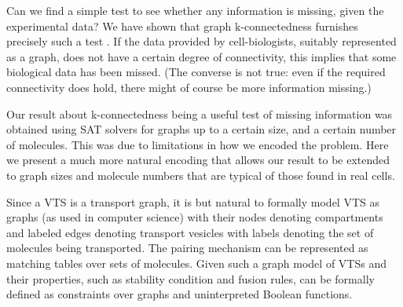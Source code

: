 Can we find a simple test to see whether any information is missing, given the experimental data? We have shown that graph k-connectedness furnishes precisely such a test \cite{shukla}. If the data provided by cell-biologists, suitably represented as a graph, does not have a certain degree of connectivity, this implies that some biological data has been missed. (The converse is not true: even if the required connectivity does hold, there might of course be more information missing.)

Our result about k-connectedness being a useful test of missing information \cite{shukla} was obtained using SAT solvers for graphs up to a certain size, and a certain number of molecules. This was due to limitations in how we encoded the problem. Here we present a much more natural encoding that allows our result to be extended to graph sizes and molecule numbers that are typical of those found in real cells.


\label{subsec:graphmodel}
%
Since a VTS is a transport graph, it is but natural to formally model
VTS as graphs (as used in computer science) with their nodes denoting
compartments and labeled edges denoting transport vesicles with labels
denoting the set of molecules being transported. The pairing mechanism
can be represented as matching tables over sets of molecules.
%
Given such a graph model of VTSs and their properties, such as
stability condition and fusion rules, can be formally defined as
constraints over graphs and uninterpreted Boolean functions.
%
\



